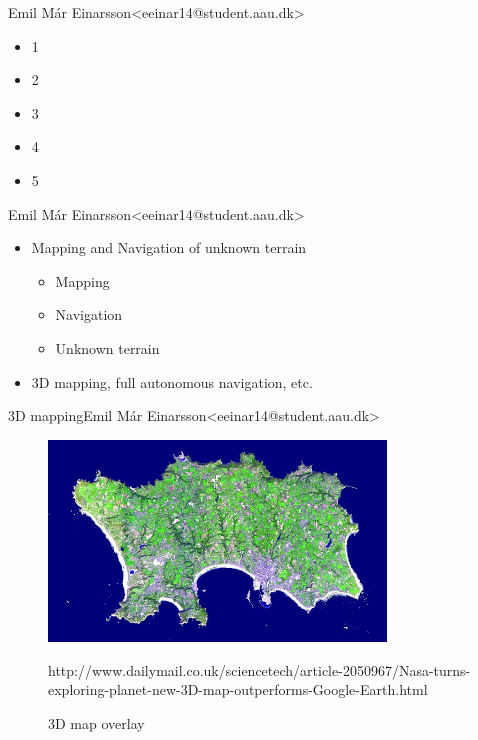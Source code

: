 \begin{frame}{}{Emil Már Einarsson\newline<eeinar14@student.aau.dk>}
  \begin{itemize}
  	\item 1
  	\item 2
  	\item 3
  	\item 4
  	\item 5
  \end{itemize}
\end{frame}

\begin{frame}{}{Emil Már Einarsson\newline<eeinar14@student.aau.dk>}
	\begin{itemize}
		\item <2-> Mapping and Navigation of unknown terrain
		\begin{itemize}
			\item <3-> Mapping %
			\item <4-> Navigation %
			\item <5-> Unknown terrain %
		\end{itemize}
		\item <6-> 3D mapping, full autonomous navigation, etc. %
	\end{itemize}
\end{frame}

\begin{frame}{3D mapping}{Emil Már Einarsson\newline<eeinar14@student.aau.dk>}
	\begin{figure}[h!]
    	\includegraphics[width=0.8\textwidth]{images/3dmap2.jpg}
    	\caption{3D map overlay}
    	\tiny{http://www.dailymail.co.uk/sciencetech/article-2050967/Nasa-turns-exploring-planet-new-3D-map-outperforms-Google-Earth.html}
		\centering    		
	\end{figure}
\end{frame}

